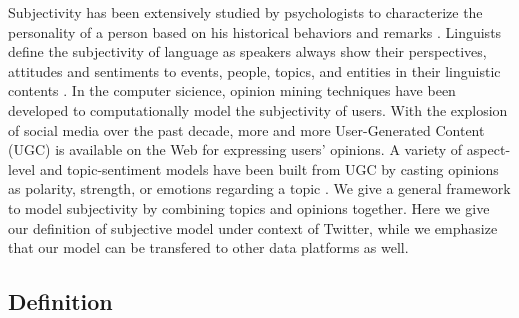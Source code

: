 \documentclass[letterpaper]{article}
\begin{document}
Subjectivity has been extensively studied by psychologists to characterize the personality of a person based on his historical behaviors and remarks \cite{engbert2007agency}. 
Linguists define the subjectivity of language as speakers always show their perspectives, attitudes and sentiments to events, people, topics, and entities in their linguistic contents \cite{stein2005subjectivity}. In the computer sicience, opinion mining techniques \cite{liu2012sentiment} have been developed to computationally model the subjectivity of users. With the explosion of social media over the past decade, more and more User-Generated Content (UGC) is available on the Web for expressing users' opinions. A variety of aspect-level and topic-sentiment models have been built from UGC by casting opinions as polarity, strength, or emotions regarding a topic \cite{lek2013aspect,mei2007topic}. We give a general framework to model subjectivity by combining topics and opinions together. Here we give our definition of subjective model under context of Twitter, while we emphasize that our model can be transfered to other data platforms as well.

\subsection{Definition}
\label{definition}
\end{document}

